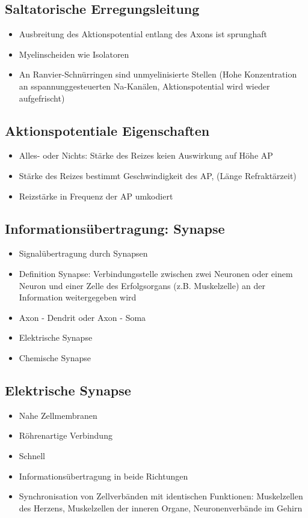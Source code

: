 \documentclass[a4paper,10pt,oneside]{article}
\begin{document}
\subsection{Saltatorische Erregungsleitung}
\begin{itemize}
	\item Ausbreitung des Aktionspotential entlang des Axons ist sprunghaft
	\item Myelinscheiden wie Isolatoren
	\item An Ranvier-Schnürringen sind unmyelinisierte Stellen (Hohe Konzentration an sspannunggesteuerten Na-Kanälen, Aktionspotential wird wieder aufgefrischt)
	
\end{itemize}

\subsection{Aktionspotentiale Eigenschaften}
\begin{itemize}
	\item Alles- oder Nichts: Stärke des Reizes keien Auswirkung auf Höhe AP
	\item Stärke des Reizes bestimmt Geschwindigkeit des AP, (Länge Refraktärzeit)
	\item Reizstärke in Frequenz der AP umkodiert
\end{itemize}

\subsection{Informationsübertragung: Synapse}
\begin{itemize}
	\item Signalübertragung durch Synapsen
	\item Definition Synapse: Verbindungsstelle zwischen zwei Neuronen oder einem Neuron und einer Zelle des Erfolgsorgans (z.B. Muskelzelle) an der Information weitergegeben wird
	\item Axon - Dendrit oder Axon - Soma
	\item Elektrische Synapse
	\item Chemische Synapse
\end{itemize}

\subsection{Elektrische Synapse}
\begin{itemize}
	\item Nahe Zellmembranen
	\item Röhrenartige Verbindung
	\item Schnell
	\item Informationsübertragung in beide Richtungen
	\item Synchronisation von Zellverbänden mit identischen Funktionen: Muskelzellen des Herzens, Muskelzellen der inneren Organe, Neuronenverbände im Gehirn
\end{itemize}
\end{document}

